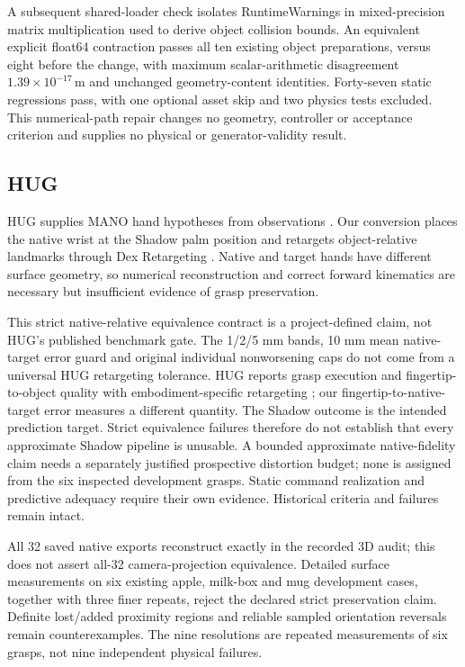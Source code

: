 \documentclass[10pt,letterpaper]{article}
\begin{document}
A subsequent shared-loader check isolates RuntimeWarnings in mixed-precision
matrix multiplication used to derive object collision bounds. An equivalent
explicit float64 contraction passes all ten existing object preparations,
versus eight before the change, with maximum scalar-arithmetic disagreement
$1.39\times10^{-17}$\,m and unchanged geometry-content identities. Forty-seven
static regressions pass, with one optional asset skip and two physics tests
excluded. This numerical-path repair changes no geometry, controller or
acceptance criterion and supplies no physical or generator-validity result.


\subsection{HUG}
HUG supplies MANO hand hypotheses from observations \cite{hug}. Our conversion
places the native wrist at the Shadow palm position and retargets object-relative
landmarks through Dex Retargeting \cite{dex}. Native and target hands have
different surface geometry, so numerical reconstruction and correct forward
kinematics are necessary but insufficient evidence of grasp preservation.

This strict native-relative equivalence contract is a project-defined claim,
not HUG's published benchmark gate. The 1/2/5 mm bands, 10 mm mean
native-target error guard and original individual nonworsening caps do not
come from a universal HUG retargeting tolerance. HUG reports grasp execution
and fingertip-to-object quality with embodiment-specific retargeting
\cite{hug}; our fingertip-to-native-target error measures a different quantity.
The Shadow outcome is the intended prediction target. Strict equivalence
failures therefore do not establish that every approximate Shadow pipeline is
unusable. A bounded approximate native-fidelity claim needs a separately
justified prospective distortion budget; none is assigned from the six
inspected development grasps. Static command realization and predictive
adequacy require their own evidence. Historical criteria and failures remain intact.

All 32 saved native exports reconstruct exactly in the recorded 3D audit;
this does not assert all-32 camera-projection equivalence. Detailed surface
measurements on six existing apple, milk-box and mug development cases, together
with three finer repeats, reject the declared strict preservation claim.
Definite lost/added proximity regions and reliable sampled orientation reversals
remain counterexamples. The nine resolutions are repeated measurements of six
grasps, not nine independent physical failures.
\end{document}
